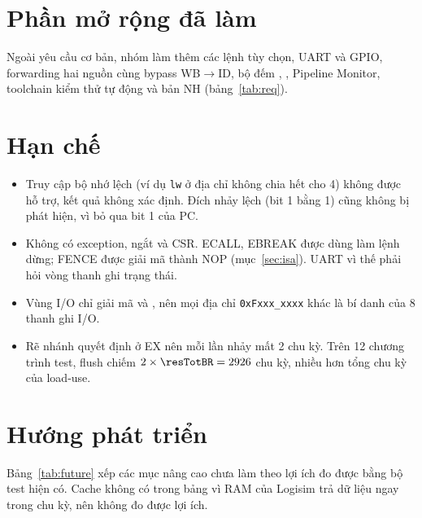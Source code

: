 \documentclass[../report.tex]{subfiles}
\begin{document}
\section{Phần mở rộng đã làm}

Ngoài yêu cầu cơ bản, nhóm làm thêm các lệnh tùy chọn, UART và GPIO, forwarding hai nguồn cùng bypass WB$\to$ID,
bộ đếm , , Pipeline Monitor, toolchain kiểm thử tự động và bản NH (bảng~\ref{tab:req}).

\section{Hạn chế}\label{sec:limits}

\begin{itemize}
  \item Truy cập bộ nhớ lệch (ví dụ \texttt{lw} ở địa chỉ không chia hết cho 4) không được hỗ trợ, kết quả không xác định.
        Đích nhảy lệch (bit 1 bằng 1) cũng không bị phát hiện, vì  bỏ qua bit 1 của PC.
  \item Không có exception, ngắt và CSR. ECALL, EBREAK được dùng làm lệnh dừng; FENCE được giải mã thành NOP
        (mục~\ref{sec:isa}). UART vì thế phải hỏi vòng thanh ghi trạng thái.
  \item Vùng I/O chỉ giải mã  và , nên mọi địa chỉ \texttt{0xFxxx\_xxxx} khác là bí
        danh của 8 thanh ghi I/O.
  \item Rẽ nhánh quyết định ở EX nên mỗi lần nhảy mất 2 chu kỳ. Trên 12 chương trình test, flush chiếm
        $2 \times \resTotBR = 2926$ chu kỳ, nhiều hơn tổng \resTotLU{} chu kỳ của load-use.
\end{itemize}

\section{Hướng phát triển}\label{sec:future}

Bảng~\ref{tab:future} xếp các mục nâng cao chưa làm theo lợi ích đo được bằng bộ test hiện có. Cache không có trong bảng
vì RAM của Logisim trả dữ liệu ngay trong chu kỳ, nên không đo được lợi ích.
\end{document}
